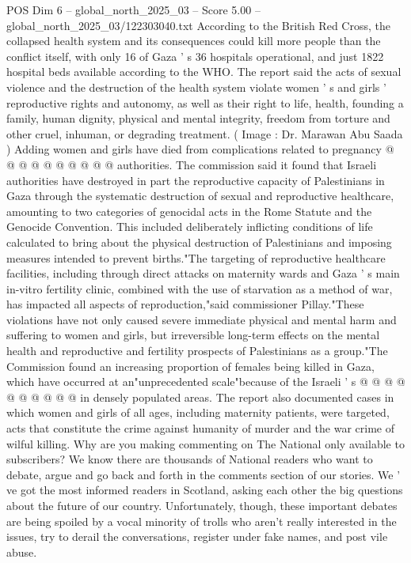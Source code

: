 \begin{textsample}{POS Dim 6 – global\_north\_2025\_03 – Score 5.00 – global\_north\_2025\_03/122303040.txt}
According to the British Red Cross, the collapsed health system and its consequences could kill more people than the conflict itself, with only 16 of Gaza ' s 36 hospitals operational, and just 1822 hospital beds available according to the WHO.
The report said the acts of sexual violence and the destruction of the health system violate women ' s and girls ' reproductive rights and autonomy, as well as their right to life, health, founding a family, human dignity, physical and mental integrity, freedom from torture and other cruel, inhuman, or degrading treatment. ( Image : Dr.
Marawan Abu Saada ) Adding women and girls have died from complications related to pregnancy @ @ @ @ @ @ @ @ @ @ authorities.
The commission said it found that Israeli authorities have destroyed in part the reproductive capacity of Palestinians in Gaza through the systematic destruction of sexual and reproductive healthcare, amounting to two categories of genocidal acts in the Rome Statute and the Genocide Convention.
This included deliberately inflicting conditions of life calculated to bring about the physical destruction of Palestinians and imposing measures intended to prevent births."The targeting of reproductive healthcare facilities, including through direct attacks on maternity wards and Gaza ' s main in-vitro fertility clinic, combined with the use of starvation as a method of war, has impacted all aspects of reproduction,"said commissioner Pillay."These violations have not only caused severe immediate physical and mental harm and suffering to women and girls, but irreversible long-term effects on the mental health and reproductive and fertility prospects of Palestinians as a group."The Commission found an increasing proportion of females being killed in Gaza, which have occurred at an"unprecedented scale"because of the Israeli ' s @ @ @ @ @ @ @ @ @ @ in densely populated areas.
The report also documented cases in which women and girls of all ages, including maternity patients, were targeted, acts that constitute the crime against humanity of murder and the war crime of wilful killing.
Why are you making commenting on The National only available to subscribers?
We know there are thousands of National readers who want to debate, argue and go back and forth in the comments section of our stories.
We ' ve got the most informed readers in Scotland, asking each other the big questions about the future of our country.
Unfortunately, though, these important debates are being spoiled by a vocal minority of trolls who aren't really interested in the issues, try to derail the conversations, register under fake names, and post vile abuse.

\end{textsample}
